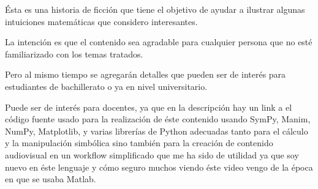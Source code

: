\documentclass[preview]{standalone}
\begin{document}
\begin{left}
Ésta es una historia de ficción que tiene el objetivo de ayudar a ilustrar algunas intuiciones matemáticas que considero interesantes. 

La intención es que el contenido sea agradable para cualquier persona que no esté familiarizado con los temas tratados.  

Pero al mismo tiempo se agregarán detalles que pueden ser de interés para estudiantes de bachillerato o ya en nivel universitario. 

Puede ser de interés para docentes, ya que en la descripción hay un link a el código fuente usado para la realización de éste contenido usando SymPy, Manim, NumPy, Matplotlib, y varias librerías de Python adecuadas tanto para el cálculo y la manipulación simbólica sino también para la creación de contenido audiovisual en un workflow simplificado que me ha sido de utilidad ya que  soy nuevo en éste lenguaje y cómo seguro muchos viendo éste video vengo de la época en que se usaba Matlab.
\end{left}
\end{document}
